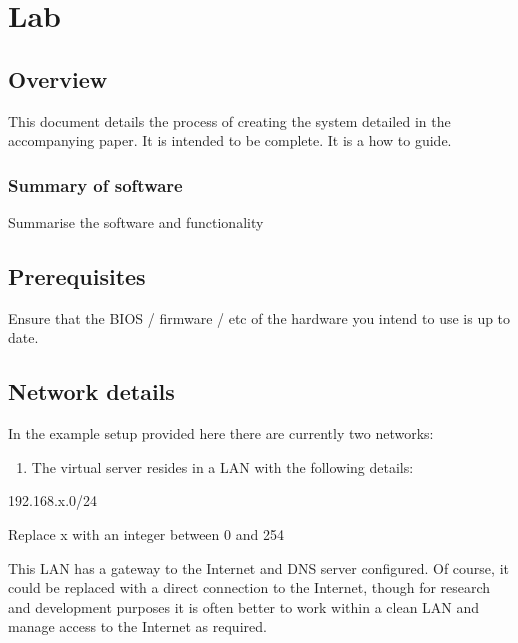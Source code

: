 \hypertarget{lab}{%
\section{Lab}\label{lab}}

\hypertarget{overview}{%
\subsection{Overview}\label{overview}}

This document details the process of creating the system detailed in the
accompanying paper. It is intended to be complete. It is a how to guide.

\hypertarget{summary-of-software}{%
\subsubsection{Summary of software}\label{summary-of-software}}

Summarise the software and functionality

\hypertarget{prerequisites}{%
\subsection{Prerequisites}\label{prerequisites}}

Ensure that the BIOS / firmware / etc of the hardware you intend to use
is up to date.

\hypertarget{network-details}{%
\subsection{Network details}\label{network-details}}

In the example setup provided here there are currently two networks:

\begin{enumerate}
\def\labelenumi{\arabic{enumi}.}
\tightlist
\item
  The virtual server resides in a LAN with the following details:
\end{enumerate}

192.168.x.0/24

Replace x with an integer between 0 and 254

This LAN has a gateway to the Internet and DNS server configured. Of
course, it could be replaced with a direct connection to the Internet,
though for research and development purposes it is often better to work
within a clean LAN and manage access to the Internet as required.

